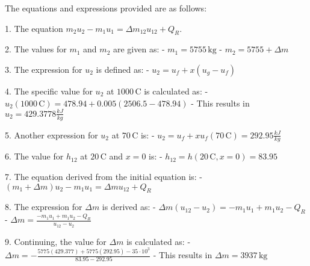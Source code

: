 The equations and expressions provided are as follows:

1. The equation \( m_2 u_2 - m_1 u_1 = \Delta m_{12} u_{12} + Q_R \).

2. The values for \( m_1 \) and \( m_2 \) are given as:
   - \( m_1 = 5755 \, \text{kg} \)
   - \( m_2 = 5755 + \Delta m \)

3. The expression for \( u_2 \) is defined as:
   - \( u_2 = u_f + x (u_g - u_f) \)

4. The specific value for \( u_2 \) at \( 1000 \, \text{C} \) is calculated as:
   - \( u_2 (1000 \, \text{C}) = 478.94 + 0.005 \left( 2506.5 - 478.94 \right) \)
   - This results in \( u_2 = 429.3778 \frac{kJ}{kg} \)

5. Another expression for \( u_2 \) at \( 70 \, \text{C} \) is:
   - \( u_2 = u_f + x u_f (70 \, \text{C}) = 292.95 \frac{kJ}{kg} \)

6. The value for \( h_{12} \) at \( 20 \, \text{C} \) and \( x = 0 \) is:
   - \( h_{12} = h (20 \, \text{C}, x = 0) = 83.95 \)

7. The equation derived from the initial equation is:
   - \( (m_1 + \Delta m) u_2 - m_1 u_1 = \Delta m u_{12} + Q_R \)

8. The expression for \( \Delta m \) is derived as:
   - \( \Delta m (u_{12} - u_2) = -m_1 u_1 + m_1 u_2 - Q_R \)
   - \( \Delta m = \frac{-m_1 u_1 + m_1 u_2 - Q_R}{u_{12} - u_2} \)

9. Continuing, the value for \( \Delta m \) is calculated as:
   - \( \Delta m = - \frac{5775 (429.377) + 5775 (292.95) - 35 \cdot 10^3}{83.95 - 292.95} \)
   - This results in \( \Delta m = 3937 \, \text{kg} \)